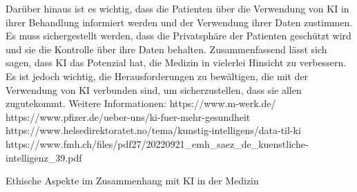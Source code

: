 \documentclass{article}
\begin{document}
{    Darüber hinaus ist es wichtig, dass die Patienten über die Verwendung von KI in ihrer Behandlung informiert werden und der Verwendung ihrer Daten zustimmen. Es muss sichergestellt werden, dass die Privatsphäre der Patienten geschützt wird und sie die Kontrolle über ihre Daten behalten.
    Zusammenfassend lässt sich sagen, dass KI das Potenzial hat, die Medizin in vielerlei Hinsicht zu verbessern. Es ist jedoch wichtig, die Herausforderungen zu bewältigen, die mit der Verwendung von KI verbunden sind, um sicherzustellen, dass sie allen zugutekommt.
    Weitere Informationen:
    https://www.m-werk.de/
    https://www.pfizer.de/ueber-uns/ki-fuer-mehr-gesundheit
    https://www.helsedirektoratet.no/tema/kunstig-intelligens/data-til-ki
    https://www.fmh.ch/files/pdf27/20220921_emh_saez_de_kuenstliche-intelligenz_39.pdf
    
    
    Ethische Aspekte im Zusammenhang mit KI in der Medizin
    
}
\end{document}
